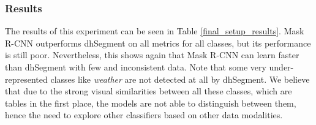 \subsubsection{Results}
The results of this experiment can be seen in Table \ref{final_setup_results}. Mask R-CNN outperforms dhSegment on all metrics for all classes, but its performance is still poor. Nevertheless, this shows again that Mask R-CNN can learn faster than dhSegment with few and inconsistent data. Note that some very under-represented classes like \textit{weather} are not detected at all by dhSegment. We believe that due to the strong visual similarities between all these classes, which are tables in the first place, the models are not able to distinguish between them, hence the need to explore other classifiers based on other data modalities.

